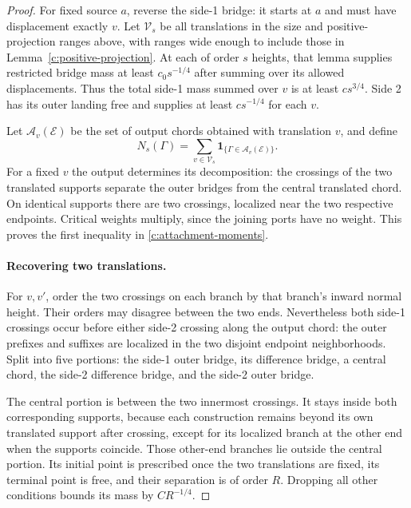 \begin{proof}
For fixed source $a$, reverse the side-1 bridge: it starts at $a$ and
must have displacement exactly $v$. Let $\mathcal V_s$ be all translations
in the size and positive-projection ranges above, with ranges wide enough
to include those in Lemma~\ref{c:positive-projection}. At each of order
$s$ heights, that lemma supplies restricted bridge mass at least
$c_0s^{-1/4}$ after summing over its allowed displacements. Thus the
total side-1 mass summed over $v$ is at least $cs^{3/4}$. Side 2 has
its outer landing free and supplies at least $cs^{-1/4}$ for each $v$.

Let $\mathcal A_v(\mathcal E)$ be the set of output chords obtained with
translation $v$, and define
\[
 N_s(\Gamma)=\sum_{v\in\mathcal V_s}
              \mathbf1_{\{\Gamma\in\mathcal A_v(\mathcal E)\}}.
\]
For a fixed $v$ the output determines its decomposition: the crossings
of the two translated supports separate the outer bridges from the
central translated chord. On identical supports there are two crossings,
localized near the two respective endpoints. Critical weights multiply,
since the joining ports have no weight. This proves the first inequality
in \eqref{c:attachment-moments}.

\paragraph{Recovering two translations.}
For $v,v'$, order the two crossings on each branch by that branch's
inward normal height. Their orders may disagree between the two ends.
Nevertheless both side-1 crossings occur before either side-2 crossing
along the output chord: the outer prefixes and suffixes are localized
in the two disjoint endpoint neighborhoods. Split into five portions:
the side-1 outer bridge, its difference bridge, a central chord, the
side-2 difference bridge, and the side-2 outer bridge.

The central portion is between the two innermost crossings. It stays
inside both corresponding supports, because each construction remains
beyond its own translated support after crossing, except for its
localized branch at the other end when the supports coincide. Those
other-end branches lie outside the central portion. Its initial point
is prescribed once the two translations are fixed, its terminal point
is free, and their separation is of order $R$. Dropping all other
conditions bounds its mass by $CR^{-1/4}$.


\end{proof}
